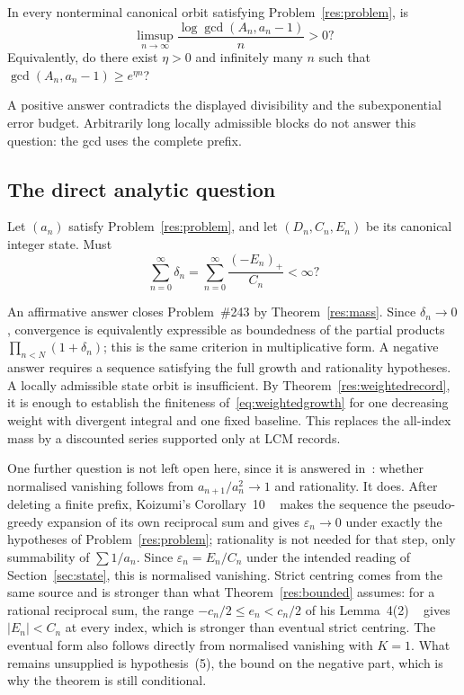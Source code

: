 \documentclass[11pt]{article}
\begin{document}
\begin{problem}\label{res:prefixgcd}
In every nonterminal canonical orbit satisfying Problem~\ref{res:problem}, is
\[
 \limsup_{n\to\infty}
 \frac{\log\gcd(A_n,a_n-1)}{n}>0?
\]
Equivalently, do there exist $\eta>0$ and infinitely many $n$ such that
$\gcd(A_n,a_n-1)\ge e^{\eta n}$?
\end{problem}

\noindent A positive answer contradicts the displayed divisibility and the
subexponential error budget.  Arbitrarily long locally admissible blocks do
not answer this question: the gcd uses the complete prefix.

\subsection{The direct analytic question}

\begin{problem}\label{res:masshyp}
Let $(a_n)$ satisfy Problem~\ref{res:problem}, and let $(D_n,C_n,E_n)$ be its
canonical integer state.  Must
\[
 \sum_{n=0}^{\infty}\delta_n
 =\sum_{n=0}^{\infty}\frac{(-E_n)_+}{C_n}<\infty ?
\]
\end{problem}

\noindent An affirmative answer closes Problem~\#243 by
Theorem~\ref{res:mass}.  Since $\delta_n\to0$, convergence is equivalently
expressible as boundedness of the partial products
$\prod_{n<N}(1+\delta_n)$; this is the same criterion in multiplicative form.
A negative answer requires a sequence satisfying the full growth and
rationality hypotheses. A locally admissible state orbit is insufficient.
By Theorem~\ref{res:weightedrecord}, it is enough to establish the finiteness
of~\eqref{eq:weightedgrowth} for one decreasing weight with divergent
integral and one fixed baseline. This replaces the all-index mass by a
discounted series supported only at LCM records.

\begin{remark}
One further question is not left open here, since it is answered
in~\cite{koizumi2025}: whether normalised vanishing follows from
$a_{n+1}/a_n^{2}\to1$ and rationality.  It does.  After
deleting a finite prefix, Koizumi's Corollary~10
~\cite[p.~8]{koizumi2025} makes the sequence the pseudo-greedy expansion of its
own reciprocal sum and gives $\varepsilon_n\to0$ under exactly the hypotheses of
Problem~\ref{res:problem}; rationality is not needed for that step, only
summability of $\sum1/a_n$.  Since $\varepsilon_n=E_n/C_n$ under the intended
reading of Section~\ref{sec:state}, this is normalised vanishing.  Strict
centring comes from the same source and is stronger than what
Theorem~\ref{res:bounded} assumes: for a rational reciprocal sum, the range
$-c_n/2\le e_n<c_n/2$ of his Lemma~4(2)
~\cite[p.~11]{koizumi2025} gives $|E_n|<C_n$ at every index, which is stronger
than eventual strict centring.  The eventual form also follows directly from
normalised vanishing with $K=1$.  What remains unsupplied is hypothesis~(5), the bound
on the negative part, which is why the theorem is still conditional.
\end{remark}
\end{document}
